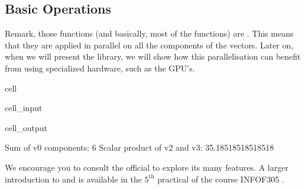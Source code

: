 \documentclass[letterpaper,10pt,english]{jupyterBook}
\begin{document}
\subsection{Basic Operations}
\label{\detokenize{01:basic-operations}}
\begin{sphinxShadowBox}
\sphinxstylesidebartitle{}

\sphinxAtStartPar
Remark, those functions (and basically, most of the  functions) are . This means that they are applied in parallel on all the components of the vectors. Later on, when we will present the  library, we will show how this parallelisation can benefit from using specialized hardware, such as the GPU’s.
\end{sphinxShadowBox}

\begin{sphinxuseclass}{cell}\begin{sphinxVerbatimInput}

\begin{sphinxuseclass}{cell_input}
\begin{sphinxVerbatim}[commandchars=\\\{\}]
  
   
 
 
\end{sphinxVerbatim}

\end{sphinxuseclass}\end{sphinxVerbatimInput}
\begin{sphinxVerbatimOutput}

\begin{sphinxuseclass}{cell_output}
\begin{sphinxVerbatim}[commandchars=\\\{\}]
Sum of v0 components: 6
Scalar product of v2 and v3: 35.18518518518518
\end{sphinxVerbatim}

\end{sphinxuseclass}\end{sphinxVerbatimOutput}

\end{sphinxuseclass}
\sphinxAtStartPar
We encourage you to consult the official  to explore its many features.
A larger introduction to  and  is available in the \(5^{\text{th}}\) practical of the course INFO\sphinxhyphen{}F305 \sphinxhyphen{} .
\end{document}
